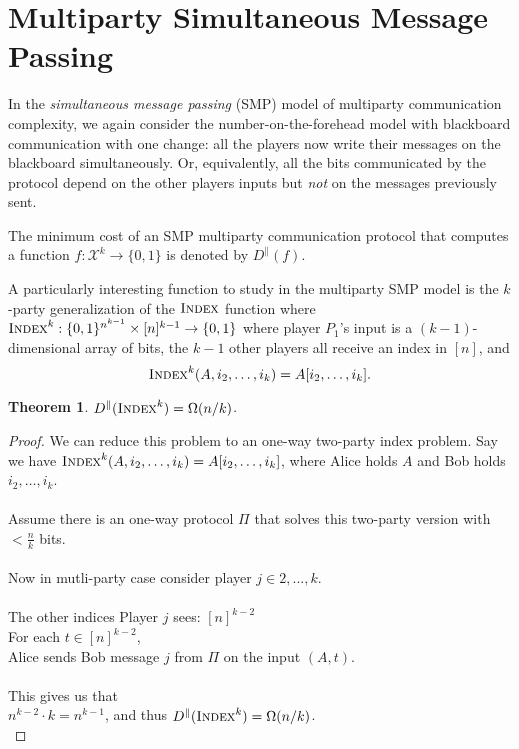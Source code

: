 \documentclass[11pt,oneside]{book}
\theoremstyle{plain}
\newtheorem{theorem}{Theorem}
\theoremstyle{definition}
\theoremstyle{plain}
\newcommand{\calX}{\mathcal{X}}
\newcommand{\Index}{\textsc{Index}}
\begin{document}
	 
	\section{Multiparty Simultaneous Message Passing}
	
	In the \emph{simultaneous message passing} (SMP) model of multiparty communication complexity, we again consider the number-on-the-forehead model with blackboard communication with one change: all the players now write their messages on the blackboard simultaneously. Or, equivalently, all the bits communicated by the protocol depend on the other players inputs but \emph{not} on the messages previously sent.
	
	The minimum cost of an SMP multiparty communication protocol that computes a function $f : \calX^k \to \{0,1\}$ is denoted by $D^\parallel(f)$.
	
	A particularly interesting function to study in the multiparty SMP model is the $k$-party generalization of the $\Index$ function where $\Index^k : \{0,1\}^{n^{k-1}} \times [n]^{k-1} \to \{0,1\}$ where player $P_1$'s input is a $(k-1)$-dimensional array of bits, the $k-1$ other players all receive an index in $[n]$, and
	\[
	\Index^k(A,i_2,\ldots,i_k) = A[i_2,\ldots,i_k].
	\]
	
	\begin{theorem}
		$D^\parallel(\Index^k) = \Omega(n/k)$.
	\end{theorem}
	
	\begin{proof}
	We can reduce this problem to an one-way two-party index problem. Say we have $\Index^k(A,i_2,\ldots,i_k) = A[i_2,\ldots,i_k]$, where Alice holds $A$ and Bob holds ${i_2,\ldots,i_k}$.\\ 
	 \\
	Assume there is an one-way protocol $\Pi$ that solves this two-party version with $<\frac{n}{k}$ bits.\\ 
	 \\
	Now in mutli-party case consider player $j\in {2,...,k}$.\\
	 \\
	The other indices Player $j$ sees: $[n]^{k-2}$\\
	For each $t\in [n]^{k-2}$,\\
	Alice sends Bob message $j$ from $\Pi$ on the input $(A,t)$.\\
	 \\
	This gives us that \\
	$n^{k-2}\cdot k=n^{k-1}$, and thus $D^\parallel(\Index^k) = \Omega(n/k)$.\\
	\end{proof}
	
\end{document}
